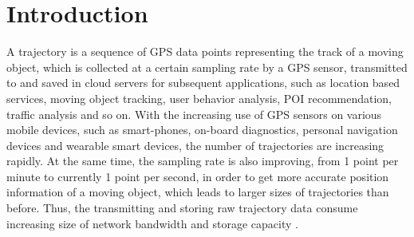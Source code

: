 \section{Introduction}
\label{sec-into}

A trajectory is a sequence of GPS data points representing the track of a moving object, which is collected at a certain sampling rate by a GPS sensor, transmitted to and saved in cloud servers for subsequent applications, such as location based services, moving object tracking, user behavior analysis, POI recommendation, {traffic analysis} and so on.
%
With the increasing use of GPS sensors on various mobile devices, such as smart-phones, on-board diagnostics, personal navigation devices and wearable smart devices, the number of trajectories are increasing rapidly.
At the same time, the sampling rate is also improving, \eg from 1 point per minute to currently 1 point per second, in order to get more accurate position information of a moving object, which leads to larger sizes of trajectories than before. Thus, the transmitting and storing raw trajectory data consume increasing size of network bandwidth and storage capacity \cite{Chen:Trajectory, Chen:Fast, Meratnia:Spatiotemporal, Keogh:online, Liu:BQS, Muckell:Compression,Cao:Spatio, Popa:Spatio, Schmid:Semantic,Richter:Semantic,Long:Direction,Nibali:Trajic}.

